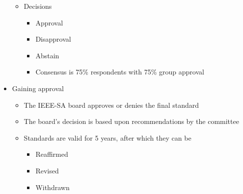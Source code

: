 \begin{itemize}
\begin{itemize}
    \item Decisions
    \begin{itemize}
      \item Approval
      \item Disapproval
      \item Abstain
      \item Consensus is 75\% respondents with 75\% group approval
    \end{itemize}
  \end{itemize}
  \item Gaining approval
  \begin{itemize}
    \item The IEEE-SA board approves or denies the final standard
    \item The board's decision is based upon recommendations by the committee
    \item Standards are valid for 5 years, after which they can be
    \begin{itemize}
      \item Reaffirmed
      \item Revised
      \item Withdrawn
    \end{itemize}
  \end{itemize}
\end{itemize}